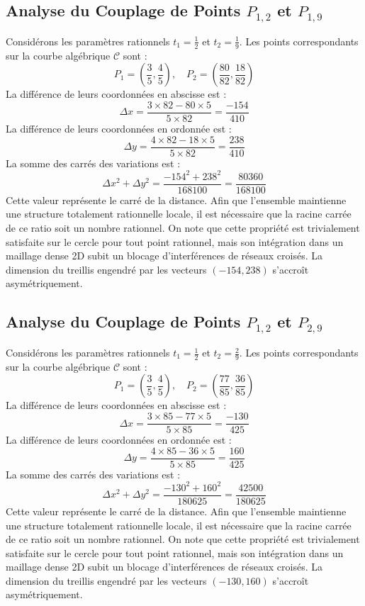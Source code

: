 \documentclass[12pt, a4paper]{article}
\begin{document}
\subsection{Analyse du Couplage de Points $P_{1,2}$ et $P_{1,9}$}
Considérons les paramètres rationnels $t_1 = \frac{1}{2}$ et $t_2 = \frac{1}{9}$.
Les points correspondants sur la courbe algébrique $\mathcal{C}$ sont :
$$ P_1 = \left( \frac{3}{5}, \frac{4}{5} \right), \quad P_2 = \left( \frac{80}{82}, \frac{18}{82} \right) $$
La différence de leurs coordonnées en abscisse est :
$$ \Delta x = \frac{3 \times 82 - 80 \times 5}{5 \times 82} = \frac{-154}{410} $$
La différence de leurs coordonnées en ordonnée est :
$$ \Delta y = \frac{4 \times 82 - 18 \times 5}{5 \times 82} = \frac{238}{410} $$
La somme des carrés des variations est :
$$ \Delta x^2 + \Delta y^2 = \frac{ -154^2 + 238^2 }{ 168100 } = \frac{ 80360 }{ 168100 } $$
Cette valeur représente le carré de la distance. Afin que l'ensemble maintienne une structure totalement rationnelle locale, il est nécessaire que la racine carrée de ce ratio soit un nombre rationnel. On note que cette propriété est trivialement satisfaite sur le cercle pour tout point rationnel, mais son intégration dans un maillage dense 2D subit un blocage d'interférences de réseaux croisés. La dimension du treillis engendré par les vecteurs $( -154, 238 )$ s'accroît asymétriquement.


\subsection{Analyse du Couplage de Points $P_{1,2}$ et $P_{2,9}$}
Considérons les paramètres rationnels $t_1 = \frac{1}{2}$ et $t_2 = \frac{2}{9}$.
Les points correspondants sur la courbe algébrique $\mathcal{C}$ sont :
$$ P_1 = \left( \frac{3}{5}, \frac{4}{5} \right), \quad P_2 = \left( \frac{77}{85}, \frac{36}{85} \right) $$
La différence de leurs coordonnées en abscisse est :
$$ \Delta x = \frac{3 \times 85 - 77 \times 5}{5 \times 85} = \frac{-130}{425} $$
La différence de leurs coordonnées en ordonnée est :
$$ \Delta y = \frac{4 \times 85 - 36 \times 5}{5 \times 85} = \frac{160}{425} $$
La somme des carrés des variations est :
$$ \Delta x^2 + \Delta y^2 = \frac{ -130^2 + 160^2 }{ 180625 } = \frac{ 42500 }{ 180625 } $$
Cette valeur représente le carré de la distance. Afin que l'ensemble maintienne une structure totalement rationnelle locale, il est nécessaire que la racine carrée de ce ratio soit un nombre rationnel. On note que cette propriété est trivialement satisfaite sur le cercle pour tout point rationnel, mais son intégration dans un maillage dense 2D subit un blocage d'interférences de réseaux croisés. La dimension du treillis engendré par les vecteurs $( -130, 160 )$ s'accroît asymétriquement.
\end{document}
